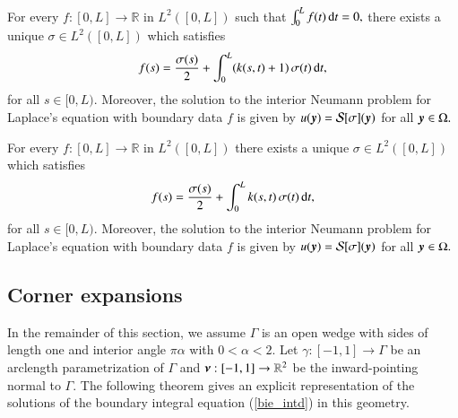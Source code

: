 \begin{theorem}
For every  $f:[0,L] \rightarrow \mathbb{R}$ in $L^{2}([0,L])$ such that $\int_{0}^{L} f(t)\,{\rm d}t = 0,$ there exists a unique $\sigma \in L^{2}([0,L])$ which satisfies
\begin{align}
f(s)=  \frac{\sigma(s)}{2}+ \int_0^L (k(s,t) + 1)\,\sigma(t)\,{\rm d}t,
\label{bie_intn}
\end{align}
for all $s \in [0,L).$ Moreover, the solution to the interior Neumann problem for Laplace's equation with boundary data $f$ is given by $u(\boldsymbol{y}) = \mathcal{S}[\sigma](\boldsymbol{y})$ for all $\boldsymbol{y} \in \Omega.$
\end{theorem}


\begin{theorem}
For every $f:[0,L] \rightarrow \mathbb{R}$ in $L^{2}([0,L])$ there exists a unique $\sigma \in L^{2}([0,L])$ which satisfies
\begin{align}
f(s)=  \frac{\sigma(s)}{2}+ \int_0^L k(s,t) \,\sigma(t)\,{\rm d}t,
\label{bie_extn}
\end{align}
for all $s \in [0,L).$ Moreover, the solution to the interior Neumann problem for Laplace's equation with boundary data $f$ is given by $u(\boldsymbol{y}) = \mathcal{S}[\sigma](\boldsymbol{y})$ for all $\boldsymbol{y} \in \Omega.$
\end{theorem}

\subsection{Corner expansions}

In the remainder of this section, we assume $\Gamma$ is an open wedge with sides of length one and interior angle $\pi \alpha$ with $0 <\alpha<2.$ Let $\gamma:[-1,1] \rightarrow \Gamma$ be an arclength parametrization of $\Gamma$ and $\boldsymbol{\nu}:[-1,1] \rightarrow \mathbb{R}^2$ be the inward-pointing normal to $\Gamma.$ 
The following theorem  gives an explicit representation of the solutions of the boundary integral equation (\ref{bie_intd}) in this geometry.

